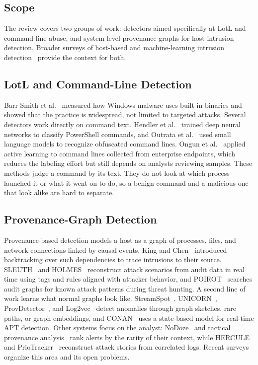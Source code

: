 \documentclass[conference]{IEEEtran}
\begin{document}
\subsection{Scope}
The review covers two groups of work: detectors aimed specifically at LotL
and command-line abuse, and system-level provenance graphs for host intrusion
detection. Broader surveys of host-based and machine-learning intrusion
detection~\cite{bridges2019host,liu2019syscall,liao2013ids,buczak2016survey}
provide the context for both.

\subsection{LotL and Command-Line Detection}
Barr-Smith et al.~\cite{barrsmith2021survivalism} measured how Windows
malware uses built-in binaries and showed that the practice is widespread,
not limited to targeted attacks. Several detectors work directly on command
text. Hendler et al.~\cite{hendler2018powershell} trained deep neural
networks to classify PowerShell commands, and Outrata et al.~\cite{outrata2024obfuscation}
used small language models to recognize obfuscated command lines. Ongun et
al.~\cite{ongun2021lotl} applied active learning to command lines collected
from enterprise endpoints, which reduces the labeling effort but still
depends on analysts reviewing samples. These methods judge a command by its
text. They do not look at which process launched it or what it went on to
do, so a benign command and a malicious one that look alike are hard to
separate.

\subsection{Provenance-Graph Detection}
Provenance-based detection models a host as a graph of processes, files, and
network connections linked by causal events. King and
Chen~\cite{king2003backtracking} introduced backtracking over such
dependencies to trace intrusions to their source. SLEUTH~\cite{hossain2017sleuth}
and HOLMES~\cite{milajerdi2019holmes} reconstruct attack scenarios from
audit data in real time using tags and rules aligned with attacker
behavior, and POIROT~\cite{milajerdi2019poirot} searches audit graphs for
known attack patterns during threat hunting. A second line of work learns
what normal graphs look like. StreamSpot~\cite{manzoor2016streamspot},
UNICORN~\cite{han2020unicorn}, ProvDetector~\cite{wang2020provdetector}, and
Log2vec~\cite{liu2019log2vec} detect anomalies through graph sketches, rare
paths, or graph embeddings, and CONAN~\cite{xiong2022conan} uses a
state-based model for real-time APT detection. Other systems focus on the
analyst: NoDoze~\cite{hassan2019nodoze} and tactical provenance
analysis~\cite{hassan2020rapsheet} rank alerts by the rarity of their
context, while HERCULE~\cite{pei2016hercule} and
PrioTracker~\cite{liu2018priotracker} reconstruct attack stories from
correlated logs. Recent surveys~\cite{zipperle2023survey,li2021survey}
organize this area and its open problems.
\end{document}
